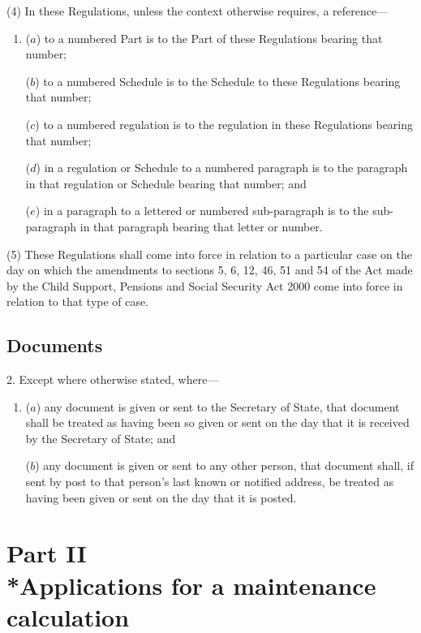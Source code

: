 \documentclass[12pt,a4paper]{article}
\begin{document}
(4) In these Regulations, unless the context otherwise requires, a reference—
\begin{enumerate}\item[]
($a$) to a numbered Part is to the Part of these Regulations bearing that number;

($b$) to a numbered Schedule is to the Schedule to these Regulations bearing that number;

($c$) to a numbered regulation is to the regulation in these Regulations bearing that number;

($d$) in a regulation or Schedule to a numbered paragraph is to the paragraph in that regulation or Schedule bearing that number; and

($e$) in a paragraph to a lettered or numbered sub-paragraph is to the sub-paragraph in that paragraph bearing that letter or number.
\end{enumerate}

(5) These Regulations shall come into force in relation to a particular case on the day on which the amendments to sections 5, 6, 12, 46, 51
and 54  %
of the Act made by the Child Support, Pensions and Social Security Act 2000 come into force in relation to that type of case.


\subsection[2. Documents]{Documents}

2.  Except where otherwise stated, where—
\begin{enumerate}\item[]
($a$) any document is given or sent to the Secretary of State, that document shall be treated as having been so given or sent on the day that it is received by the Secretary of State; and

($b$) any document is given or sent to any other person, that document shall, if sent by post to that person’s last known or notified address, be treated as having been given or sent on the day that it is posted.
\end{enumerate}

\section[Part II --- Applications for a maintenance calculation]{Part II\\*Applications for a maintenance calculation}
\end{document}
